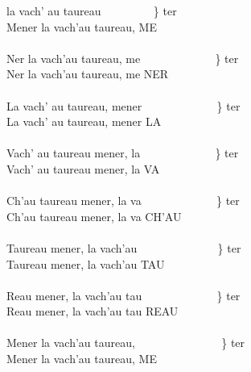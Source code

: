 
\vspace{\baselineskip}
 la vach' au taureau ~~~~~~~~ \} ter
\\Mener la vach'au taureau, ME
\\\\Ner la vach'au taureau, me ~~~~~~~~~~~~ \} ter
\\Ner la vach'au taureau, me NER
\\\\La vach' au taureau, mener ~~~~~~~~~~~~ \} ter
\\La vach' au taureau, mener LA
\\\\Vach' au taureau mener, la ~~~~~~~~~~~~ \} ter
\\Vach' au taureau mener, la VA
\\\\Ch'au taureau mener, la va ~~~~~~~~~~~~ \} ter
\\Ch'au taureau mener, la va CH'AU
\\\\Taureau mener, la vach'au ~~~~~~~~~~~~~ \} ter
\\Taureau mener, la vach'au TAU
\\\\Reau mener, la vach'au tau ~~~~~~~~~~~~ \} ter
\\Reau mener, la vach'au tau REAU
\\\\Mener la vach'au taureau, ~~~~~~~~~~~~~~ \} ter
\\Mener la vach'au taureau, ME
\\
\breakpage